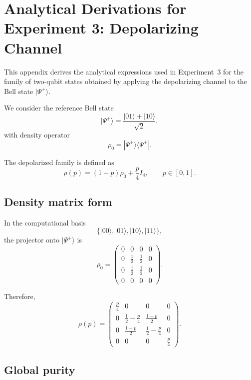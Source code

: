 \documentclass[a4paper]{article}
\begin{document}
\section{Analytical Derivations for Experiment 3: Depolarizing Channel}

This appendix derives the analytical expressions used in Experiment~3 for the family of two-qubit states obtained by applying the depolarizing channel to the Bell state \( |\Psi^+\rangle \).

We consider the reference Bell state
\[
|\Psi^+\rangle = \frac{|01\rangle + |10\rangle}{\sqrt{2}},
\]
with density operator
\[
\rho_0 = |\Psi^+\rangle\langle\Psi^+|.
\]

The depolarized family is defined as
\[
\rho(p)
=
(1-p)\rho_0 + \frac{p}{4}I_4,
\qquad
p \in [0,1].
\]


\subsection*{Density matrix form}

In the computational basis
\[
\{|00\rangle, |01\rangle, |10\rangle, |11\rangle\},
\]
the projector onto \( |\Psi^+\rangle \) is
\[
\rho_0
=
\begin{pmatrix}
0 & 0 & 0 & 0\\
0 & \frac12 & \frac12 & 0\\
0 & \frac12 & \frac12 & 0\\
0 & 0 & 0 & 0
\end{pmatrix}.
\]

Therefore,
\[
\rho(p)
=
\begin{pmatrix}
\frac{p}{4} & 0 & 0 & 0\\
0 & \frac12-\frac{p}{4} & \frac{1-p}{2} & 0\\
0 & \frac{1-p}{2} & \frac12-\frac{p}{4} & 0\\
0 & 0 & 0 & \frac{p}{4}
\end{pmatrix}.
\]


\subsection*{Global purity}
\end{document}
